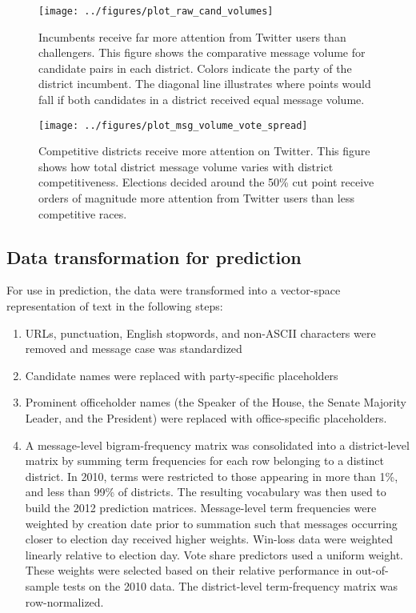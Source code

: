 \documentclass{article}
\begin{document}
\begin{figure}[ht]
  \centering
  \texttt{[image: ../figures/plot\_raw\_cand\_volumes]}
  \caption{Incumbents receive far more attention from Twitter users
    than challengers. This figure shows the comparative message volume for
    candidate pairs in each district. Colors indicate the party of the
    district incumbent. The diagonal line illustrates where points would fall if both candidates in a district received equal message volume.}
  \label{fig:cand-msg-volume}
\end{figure}

\begin{figure}[ht]
  \centering
  \texttt{[image: ../figures/plot\_msg\_volume\_vote\_spread]}
  \caption{Competitive districts receive more attention on
    Twitter. This figure shows how total district message volume
    varies with district competitiveness. Elections decided around the
  50\% cut point receive orders of magnitude more attention from
  Twitter users than less competitive races.}
  \label{fig:msg-volume-vote-spread}
\end{figure}



\subsection{Data transformation for prediction}
\label{sec:data-transf-pred}

For use in prediction, the data were transformed into a vector-space
representation of text in the following steps:
\begin{enumerate}
\item URLs, punctuation, English stopwords, and non-ASCII characters were removed and
  message case was standardized
\item Candidate names were replaced with party-specific placeholders
\item Prominent officeholder names (the Speaker of the House, the Senate
  Majority Leader, and the President) were replaced with
  office-specific placeholders. 
\item A message-level bigram-frequency matrix
  was consolidated into a district-level matrix by summing term
  frequencies for each row belonging to a distinct district. In 2010,
  terms were restricted to those appearing in more than 1\%, and less
  than 99\% of districts. The resulting vocabulary was then used to build
  the 2012 prediction matrices. Message-level term frequencies were
  weighted by creation date prior to summation such that messages
  occurring closer to election day received higher weights. Win-loss data were
   weighted linearly relative to election
  day. Vote share 
  predictors used a uniform weight. These weights were
  selected based on their relative performance in out-of-sample tests
  on the 2010 data. The district-level term-frequency matrix was row-normalized.
\end{enumerate}
\end{document}
